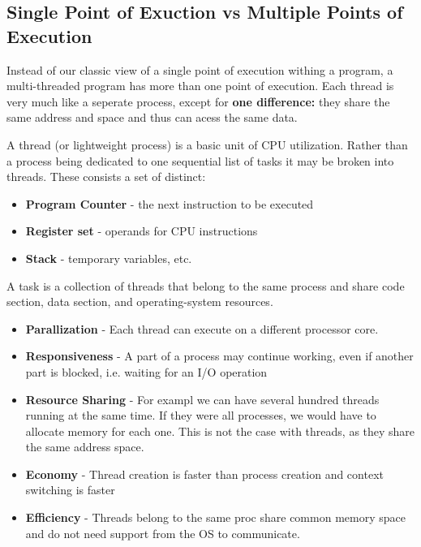 \documentclass[a4paper, 10pt]{article}
\begin{document}
\subsection{Single Point of Exuction vs Multiple Points of Execution}
Instead of our classic view of a single point of execution withing a program, a multi-threaded program has more than one point of execution. Each thread is very much like a seperate process, except for \textbf{one difference:} they share the same address and space and thus can acess the same data.
\begin{definitionbox}[Thread]
    A thread (or lightweight process) is a basic unit of CPU utilization. Rather than a process being dedicated to one sequential list of tasks it may be broken into threads. These consists a set of distinct:
    \begin{itemize}
        \item \textbf{Program Counter} - the next instruction to be executed
        \item \textbf{Register set} - operands for CPU instructions
        \item \textbf{Stack} - temporary variables, etc.
    \end{itemize}
\end{definitionbox}
\begin{definitionbox}[Task]
    A task is a collection of threads that belong to the same process and share code section, data section, and operating-system resources.
\end{definitionbox}
\begin{conceptbox}
    \begin{itemize}
        \item \textbf{Parallization} - Each thread can execute on a different processor core.
        \item \textbf{Responsiveness} - A part of a process may continue working, even if another part is blocked, i.e. waiting for an I/O operation
        \item \textbf{Resource Sharing} - For exampl we can have several hundred threads running at the same time. If they were all processes, we would have to allocate memory for each one. This is not the case with threads, as they share the same address space.
        \item \textbf{Economy} - Thread creation is faster than process creation and context switching is faster
        \item \textbf{Efficiency} - Threads belong to the same proc share common memory space and do not need support from the OS to communicate.
    \end{itemize}
\end{conceptbox}
\end{document}
